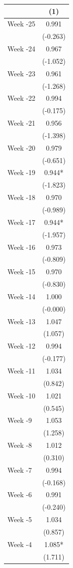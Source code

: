 \begin{tabular}{lc}
\toprule
 & (1) \\
\midrule
Week -25 & 0.991 \\
 & (-0.263) \\
Week -24 & 0.967 \\
 & (-1.052) \\
Week -23 & 0.961 \\
 & (-1.268) \\
Week -22 & 0.994 \\
 & (-0.175) \\
Week -21 & 0.956 \\
 & (-1.398) \\
Week -20 & 0.979 \\
 & (-0.651) \\
Week -19 & 0.944* \\
 & (-1.823) \\
Week -18 & 0.970 \\
 & (-0.989) \\
Week -17 & 0.944* \\
 & (-1.957) \\
Week -16 & 0.973 \\
 & (-0.809) \\
Week -15 & 0.970 \\
 & (-0.830) \\
Week -14 & 1.000 \\
 & (-0.000) \\
Week -13 & 1.047 \\
 & (1.057) \\
Week -12 & 0.994 \\
 & (-0.177) \\
Week -11 & 1.034 \\
 & (0.842) \\
Week -10 & 1.021 \\
 & (0.545) \\
Week -9 & 1.053 \\
 & (1.258) \\
Week -8 & 1.012 \\
 & (0.310) \\
Week -7 & 0.994 \\
 & (-0.168) \\
Week -6 & 0.991 \\
 & (-0.240) \\
Week -5 & 1.034 \\
 & (0.857) \\
Week -4 & 1.085* \\
 & (1.711) \\

\end{tabular}
